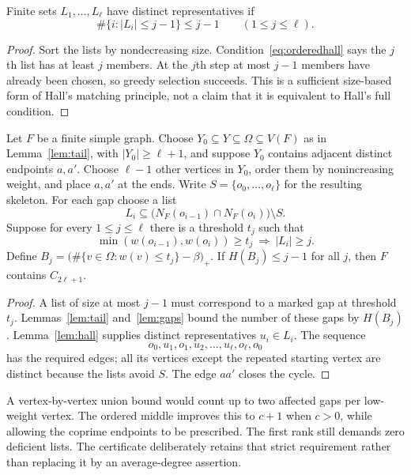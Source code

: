 \begin{lemma}\label{lem:hall}
Finite sets $L_1,\ldots,L_\ell$ have distinct representatives if
\begin{equation}\label{eq:orderedhall}
\#\{i:|L_i|\le j-1\}\le j-1\qquad(1\le j\le\ell).
\end{equation}
\end{lemma}
\begin{proof}
Sort the lists by nondecreasing size. Condition~\eqref{eq:orderedhall} says the $j$th list has at least $j$ members. At the $j$th step at most $j-1$ members have already been chosen, so greedy selection succeeds. This is a sufficient size-based form of Hall's matching principle, not a claim that it is equivalent to Hall's full condition.
\end{proof}

\begin{theorem}\label{thm:abstract}
Let $F$ be a finite simple graph. Choose $Y_0\subseteq Y\subseteq\Omega\subseteq V(F)$ as in Lemma~\ref{lem:tail}, with $|Y_0|\ge\ell+1$, and suppose $Y_0$ contains adjacent distinct endpoints $a,a'$. Choose $\ell-1$ other vertices in $Y_0$, order them by nonincreasing weight, and place $a,a'$ at the ends. Write $S=\{o_0,\ldots,o_\ell\}$ for the resulting skeleton. For each gap choose a list
\[
L_i\subseteq\bigl(N_F(o_{i-1})\cap N_F(o_i)\bigr)\setminus S.
\]
Suppose for every $1\le j\le\ell$ there is a threshold $t_j$ such that
\[
\min(w(o_{i-1}),w(o_i))\ge t_j\ \Longrightarrow\ |L_i|\ge j.
\]
Define $B_j=\bigl(\#\{v\in\Omega:w(v)\le t_j\}-\beta\bigr)_+$.
If $H(B_j)\le j-1$ for all $j$, then $F$ contains $C_{2\ell+1}$.
\end{theorem}
\begin{proof}
A list of size at most $j-1$ must correspond to a marked gap at threshold $t_j$. Lemmas~\ref{lem:tail} and~\ref{lem:gaps} bound the number of these gaps by $H(B_j)$. Lemma~\ref{lem:hall} supplies distinct representatives $u_i\in L_i$. The sequence
\[
 o_0,u_1,o_1,u_2,\ldots,u_\ell,o_\ell,o_0
\]
has the required edges; all its vertices except the repeated starting vertex are distinct because the lists avoid $S$. The edge $aa'$ closes the cycle.
\end{proof}

\begin{remark}
A vertex-by-vertex union bound would count up to two affected gaps per low-weight vertex. The ordered middle improves this to $c+1$ when $c>0$, while allowing the coprime endpoints to be prescribed. The first rank still demands zero deficient lists. The certificate deliberately retains that strict requirement rather than replacing it by an average-degree assertion.
\end{remark}

